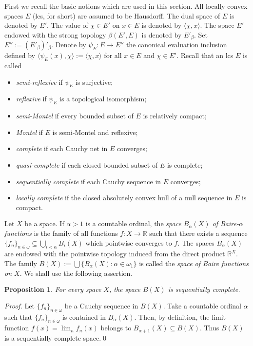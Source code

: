 \documentclass[preprint,11pt]{elsarticle}
\newtheorem{proposition}[theorem]{Proposition}
\numberwithin{equation}{section}
\numberwithin{theorem}{section}
\newcommand{\w}{\omega}
\newcommand{\IR}{\mathbb{R}}
\begin{document}
First we recall the basic notions which are used in this section. All locally convex spaces $E$ (lcs, for short) are assumed to be Hausdorff. The dual space of $E$ is denoted by $E'$. The value of $\chi\in E'$ on $x\in E$ is denoted by $\langle \chi,x\rangle$. The space $E'$ endowed with the strong topology $\beta(E',E)$ is denoted by $E'_\beta$. Set $E'' :=(E'_\beta)'_\beta$. Denote by $\psi_E: E\to E''$ the canonical evaluation inclusion defined by $\langle \psi_E(x),\chi\rangle:=\langle \chi,x\rangle$ for all $x\in E$ and $\chi\in E'$.
Recall that an lcs $E$ is called
\begin{itemize}\itemsep=1pt\parskip=1pt
\item {\em semi-reflexive} if $\psi_E$ is surjective;
\item {\em reflexive} if $\psi_E$ is a topological isomorphism;
\item {\em semi-Montel} if every bounded subset of $E$ is relatively compact;
\item {\em Montel} if $E$ is semi-Montel and reflexive;
\item {\em complete} if each Cauchy net in $E$  converges;
\item {\em quasi-complete} if each closed bounded subset of $E$ is complete;
\item {\em sequentially complete} if each Cauchy sequence in $E$ converges;
\item {\em locally complete} if the closed absolutely convex hull of a null sequence in $E$ is compact.
\end{itemize}

Let $X$ be a space. If $\alpha>1$ is a countable ordinal, the  {\em space $B_\alpha(X)$ of Baire-$\alpha$ functions} is the family of all functions  $f:X\to \IR$ such that  there exists a sequence $\{ f_n\}_{n\in\w} \subseteq \bigcup_{i<\alpha} B_i(X)$ which pointwise converges to $f$. The spaces $B_\alpha(X)$ are endowed with the pointwise topology induced from the direct product $\IR^X$. The family $B(X):=\bigcup\{B_{\alpha}(X): \alpha\in \w_1\}$ is called the {\em space of Baire functions on $X$}. We shall use the following assertion.
\begin{proposition} \label{p:B(X)-seq-compl}
For every space $X$, the space $B(X)$ is sequentially complete.
\end{proposition}

\begin{proof}
Let $\{f_n\}_{n\in\w}$ be a Cauchy sequence in $B(X)$. Take a countable ordinal $\alpha$ such that $\{f_n\}_{n\in\w}$ is contained in $B_\alpha(X)$. Then, by definition, the limit function $f(x)=\lim_n f_n(x)$ belongs to $B_{\alpha+1}(X)\subseteq B(X)$. Thus $B(X)$ is a sequentially complete space.\qed
\end{proof}
\end{document}
